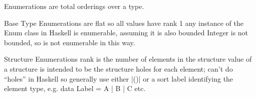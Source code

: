        




Enumerations are total orderings over a type.

Base Type Enumerations
are flat so all values have rank 1
any instance of the Enum class in Haskell is enumerable, assuming it is also bounded
Integer is not bounded, so is not enumerable in this way.

Structure Enumerations
rank is the number of elements in the structure
value of a structure is intended to be the structure holes for each element;
can't do ``holes'' in Haskell so generally use either |()| or a sort label identifying the element type,
e.g. data Label = A | B | C etc.

